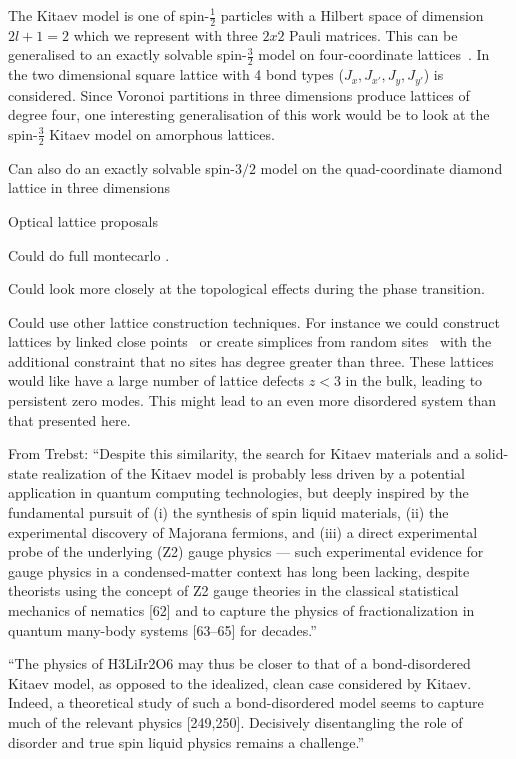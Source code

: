 The Kitaev model is one of spin-\(\tfrac{1}{2}\) particles with a Hilbert space of dimension \(2l + 1 = 2\) which we represent with three \(2x2\) Pauli matrices. This can be generalised to an exactly solvable spin-\(\tfrac{3}{2}\) model on four-coordinate lattices~\autocite{yaoAlgebraicSpinLiquid2009,wenQuantumOrderStringnet2003}. In~\autocite{yaoAlgebraicSpinLiquid2009} the two dimensional square lattice with 4 bond types (\(J_x, J_{x'},J_y, J_{y'}\)) is considered. Since Voronoi partitions in three dimensions produce lattices of degree four, one interesting generalisation of this work would be to look at the spin-\(\tfrac{3}{2}\) Kitaev model on amorphous lattices.

Can also do an exactly solvable spin-\(3/2\) model on the quad-coordinate diamond lattice in three dimensions\autocite{ryuThreedimensionalTopologicalPhase2009}

Optical lattice proposals~\autocite{duanControllingSpinExchange2003,micheliToolboxLatticespinModels2006}

Could do full montecarlo .

Could look more closely at the topological effects during the phase transition.

Could use other lattice construction techniques. For instance we could construct lattices by linked close points~\autocite{agarwala2019topological} or create simplices from random sites~\autocite{christRandomLatticeField1982} with the additional constraint that no sites has degree greater than three. These lattices would like have a large number of lattice defects \(z < 3\) in the bulk, leading to persistent zero modes. This might lead to an even more disordered system than that presented here.

From Trebst: ``Despite this similarity, the search for Kitaev materials and a solid-state realization of the Kitaev model is probably less driven by a potential application in quantum computing technologies, but deeply inspired by the fundamental pursuit of (i) the synthesis of spin liquid materials, (ii) the experimental discovery of Majorana fermions, and (iii) a direct experimental probe of the underlying (Z2) gauge physics --- such experimental evidence for gauge physics in a condensed-matter context has long been lacking, despite theorists using the concept of Z2 gauge theories in the classical statistical mechanics of nematics {[}62{]} and to capture the physics of fractionalization in quantum many-body systems {[}63--65{]} for decades.''

``The physics of H3LiIr2O6 may thus be closer to that of a bond-disordered Kitaev model, as opposed to the idealized, clean case considered by Kitaev. Indeed, a theoretical study of such a bond-disordered model seems to capture much of the relevant physics {[}249,250{]}. Decisively disentangling the role of disorder and true spin liquid physics remains a challenge.''

